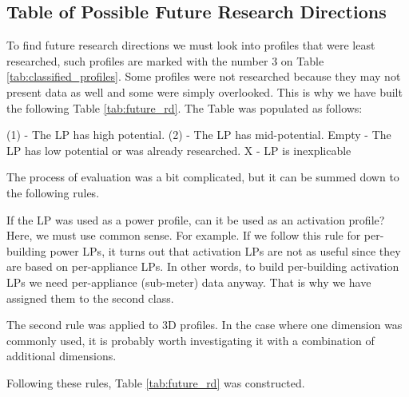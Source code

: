 \subsection{Table of Possible Future Research Directions}

To find future research directions we must look into profiles that were least researched,
such profiles are marked with the number 3 on Table \ref{tab:classified_profiles}.
Some profiles were not researched because they may not present data as well and some were simply overlooked. 
This is why we have built the following Table \ref{tab:future_rd}.
The Table was populated as follows:

\begin{outline} 
\1 (1) - The LP has high potential. 
\1 (2) - The LP has mid-potential.
\1 Empty - The LP has low potential or was already researched.
\1 X - LP is inexplicable
\end{outline}

The process of evaluation was a bit complicated, but it can be summed down to the following rules.

If the LP was used as a power profile, can it be used as an activation profile?
Here, we must use common sense.
For example. If we follow this rule for per-building power LPs, it 
turns out that activation LPs are not as useful since they are based on per-appliance LPs.
In other words, to build per-building activation LPs we need per-appliance (sub-meter) data anyway.
That is why we have assigned them to the second class.

The second rule was applied to 3D profiles.
In the case where one dimension was commonly used, it is probably worth investigating it with a combination of additional dimensions. 

Following these rules, Table  \ref{tab:future_rd} was constructed.


